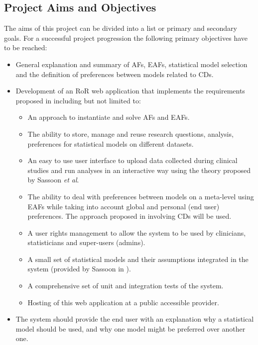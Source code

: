
\subsection{Project Aims and Objectives} 
\label{sub:aims}

The aims of this project can be divided into a list or primary and secondary goals. For a successful project progression the following primary objectives have to be reached:
\begin{itemize}
	\item General explanation and summary of \glspl{AF}, \glspl{EAF}, statistical model selection and the definition of preferences between models related to \glspl{CD}.
	\item Development of an \gls{RoR} web application that implements the requirements proposed in \cite{sassoon2014,sassoon2016CD} including but not limited to:
	\begin{itemize}
		\item An approach to instantiate and solve \glspl{AF} and \glspl{EAF}.
		\item The ability to store, manage and reuse research questions, analysis, preferences for statistical models on different datasets.
		\item An easy to use user interface to upload data collected during clinical studies and run analyses in an interactive way using the theory proposed by Sassoon \textit{et al}.
		\item The ability to deal with preferences between models on a meta-level using \glspl{EAF} while taking into account global and personal (end user) preferences. The approach proposed in \cite{sassoon2016CD} involving \glspl{CD} will be used.
		\item A user rights management to allow the system to be used by clinicians, statisticians and super-users (admins).
		\item A small set of statistical models and their assumptions integrated in the system (provided by Sassoon in \cite{sassoon2016CD}).
		\item A comprehensive set of unit and integration tests of the system.
		\item Hosting of this web application at a public accessible provider.
	\end{itemize}	
	\item The system should provide the end user with an explanation why a statistical model should be used, and why one model might be preferred over another one.
\end{itemize}

